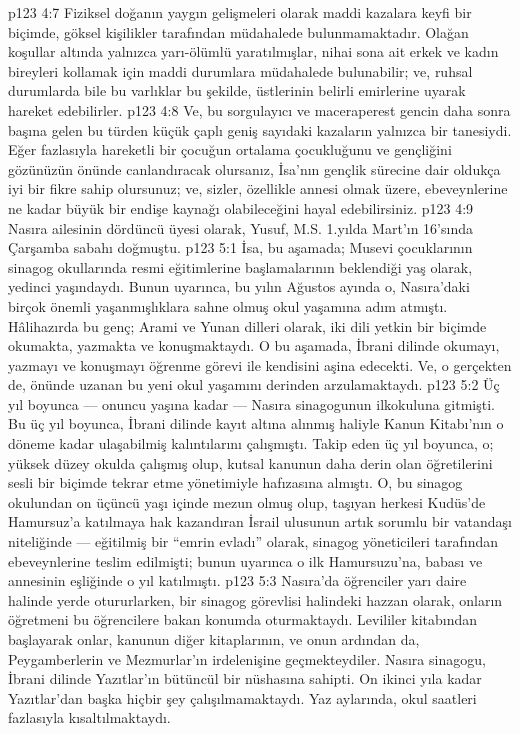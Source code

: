 \vs p123 4:7 Fiziksel doğanın yaygın gelişmeleri olarak maddi kazalara keyfi bir biçimde, göksel kişilikler tarafından müdahalede bulunmamaktadır. Olağan koşullar altında yalnızca yarı\hyp{}ölümlü yaratılmışlar, nihai sona ait erkek ve kadın bireyleri kollamak için maddi durumlara müdahalede bulunabilir; ve, ruhsal durumlarda bile bu varlıklar bu şekilde, üstlerinin belirli emirlerine uyarak hareket edebilirler.
\vs p123 4:8 Ve, bu sorgulayıcı ve maceraperest gencin daha sonra başına gelen bu türden küçük çaplı geniş sayıdaki kazaların yalnızca bir tanesiydi. Eğer fazlasıyla hareketli bir çocuğun ortalama çocukluğunu ve gençliğini gözünüzün önünde canlandıracak olursanız, İsa’nın gençlik sürecine dair oldukça iyi bir fikre sahip olursunuz; ve, sizler, özellikle annesi olmak üzere, ebeveynlerine ne kadar büyük bir endişe kaynağı olabileceğini hayal edebilirsiniz.
\vs p123 4:9 Nasıra ailesinin dördüncü üyesi olarak, Yusuf, M.S. 1.yılda Mart’ın 16’sında Çarşamba sabahı doğmuştu.
\vs p123 5:1 İsa, bu aşamada; Musevi çocuklarının sinagog okullarında resmi eğitimlerine başlamalarının beklendiği yaş olarak, yedinci yaşındaydı. Bunun uyarınca, bu yılın Ağustos ayında o, Nasıra’daki birçok önemli yaşanmışlıklara sahne olmuş okul yaşamına adım atmıştı. Hâlihazırda bu genç; Arami ve Yunan dilleri olarak, iki dili yetkin bir biçimde okumakta, yazmakta ve konuşmaktaydı. O bu aşamada, İbrani dilinde okumayı, yazmayı ve konuşmayı öğrenme görevi ile kendisini aşina edecekti. Ve, o gerçekten de, önünde uzanan bu yeni okul yaşamını derinden arzulamaktaydı.
\vs p123 5:2 Üç yıl boyunca --- onuncu yaşına kadar --- Nasıra sinagogunun ilkokuluna gitmişti. Bu üç yıl boyunca, İbrani dilinde kayıt altına alınmış haliyle Kanun Kitabı’nın o döneme kadar ulaşabilmiş kalıntılarını çalışmıştı. Takip eden üç yıl boyunca, o; yüksek düzey okulda çalışmış olup, kutsal kanunun daha derin olan öğretilerini sesli bir biçimde tekrar etme yönetimiyle hafızasına almıştı. O, bu sinagog okulundan on üçüncü yaşı içinde mezun olmuş olup, taşıyan herkesi Kudüs’de Hamursuz’a katılmaya hak kazandıran İsrail ulusunun artık sorumlu bir vatandaşı niteliğinde --- eğitilmiş bir “emrin evladı” olarak, sinagog yöneticileri tarafından ebeveynlerine teslim edilmişti; bunun uyarınca o ilk Hamursuzu’na, babası ve annesinin eşliğinde o yıl katılmıştı.
\vs p123 5:3 Nasıra’da öğrenciler yarı daire halinde yerde otururlarken, bir sinagog görevlisi halindeki hazzan olarak, onların öğretmeni bu öğrencilere bakan konumda oturmaktaydı. Levililer kitabından başlayarak onlar, kanunun diğer kitaplarının, ve onun ardından da, Peygamberlerin ve Mezmurlar’ın irdelenişine geçmekteydiler. Nasıra sinagogu, İbrani dilinde Yazıtlar’ın bütüncül bir nüshasına sahipti. On ikinci yıla kadar Yazıtlar’dan başka hiçbir şey çalışılmamaktaydı. Yaz aylarında, okul saatleri fazlasıyla kısaltılmaktaydı.
